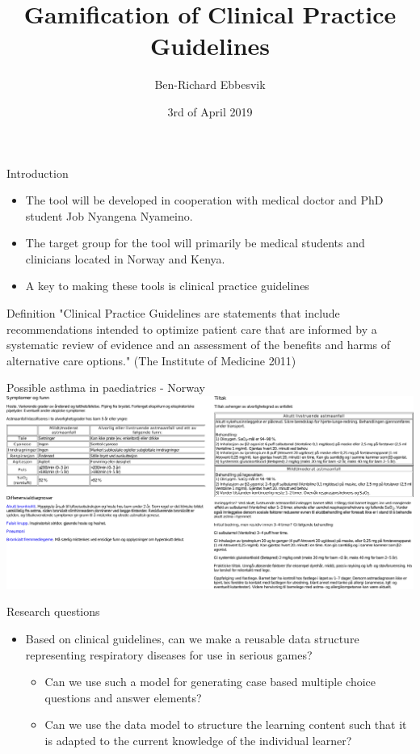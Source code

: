\documentclass{beamer}
\begin{document}
\title{Gamification of Clinical Practice Guidelines}
\author{Ben-Richard Ebbesvik}
\date{3rd of April 2019}
\subject{Master thesis}
\frame{\titlepage}


\begin{frame}{Introduction}
\begin{itemize}
	\item The tool will be developed in cooperation with medical doctor and PhD student Job Nyangena Nyameino.
	\item The target group for the tool will primarily be medical students and clinicians located in Norway and Kenya.
	\item A key to making these tools is clinical practice guidelines
\end{itemize}
\begin{block}{Definition}	
	 "Clinical Practice Guidelines are statements that include recommendations intended to optimize patient care that are informed by a systematic review of evidence and an assessment of the benefits and harms of alternative care options." (The Institute of Medicine 2011)
\end{block}
\end{frame}

\begin{frame}{Possible asthma in paediatrics - Norway}
\includegraphics[scale=0.32]{NorwayCPG}
\end{frame}


\begin{frame}{Research questions}
\begin{itemize}
		\item Based on clinical guidelines, can we make a reusable data structure representing respiratory diseases for use in serious games?
		\begin{itemize}
			\item Can we use such a model for generating case based multiple choice questions and answer elements?
			\item Can we use the data model to structure the learning content such that it is adapted to the current knowledge of the individual learner?
		\end{itemize}		
\end{itemize}
\end{frame}
\end{document}
